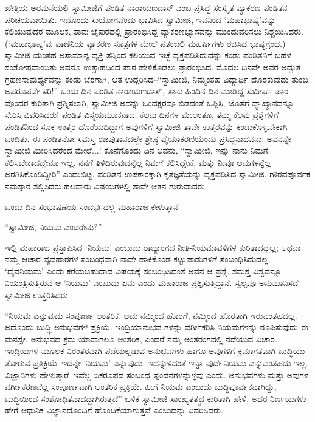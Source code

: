 ಖೇತ್ರಿಯ ಅರಮನೆಯಲ್ಲಿ ಸ್ವಾಮೀಜಿಗೆ ಪಂಡಿತ ನಾರಾಯಣದಾಸ್ ಎಂಬ ಪ್ರಸಿದ್ಧ ಸಂಸ್ಕೃತ ವ್ಯಾಕರಣ ಪಂಡಿತನ ಪರಿಚಯವಾಯಿತು. ಇದೊಂದು ಸುಯೋಗವೆಂದು ಭಾವಿಸಿದ ಸ್ವಾಮೀಜಿ, ಇವನಿಂದ ‘ಮಹಾಭಾಷ್ಯ’ವನ್ನು ಕಲಿಯುವುದರ ಮೂಲಕ, ತಾವು ಜೈಪುರದಲ್ಲಿ ಪ್ರಾರಂಭಿಸಿದ್ದ ವ್ಯಾಕರಣಭ್ಯಾಸವನ್ನು ಮುಂದುವರಿಸಲು ನಿಶ್ಚಯಿಸಿದರು. (‘ಮಹಾಭಾಷ್ಯ’ವು ಪಾಣಿನಿಯ ವ್ಯಾಕರಣ ಸೂತ್ರಗಳ ಮೇಲೆ ಪತಂಜಲಿ ಮಹರ್ಷಿಗಳು ರಚಿಸಿದ ಭಾಷ್ಯಗ್ರಂಥ.) ಸ್ವಾಮೀಜಿ ಯಂತಹ ಅಸಾಮಾನ್ಯ ವ್ಯಕ್ತಿ ತನ್ನಿಂದ ಕಲಿಯುವ ಇಚ್ಛೆ ವ್ಯಕ್ತಪಡಿಸಿದುದನ್ನು ಕಂಡು ಪಂಡಿತನಿಗೆ ಬಹಳ ಸಂತೋಷವಾಯಿತು ಅವನೂ ಉತ್ಸಾಹದಿಂದ ಪಾಠ ಹೇಳಿಕೊಡಲು ಪ್ರಾರಂಭಿಸಿದ. ಮೊದಲ ದಿನವೇ ಅವರ ಅದ್ಭುತ ಗ್ರಹಣಸಾಮರ್ಥ್ಯವನ್ನು ಕಂಡು ಬೆರಗಾಗಿ, ಆತ ಉದ್ಗರಿಸಿದ–“ಸ್ವಾಮೀಜಿ, ನಿಮ್ಮಂತಹ ವಿದ್ಯಾರ್ಥಿ ದೊರಕುವುದು ತುಂಬ ಅಪರೂಪವೇ ಸರಿ!” ಒಂದು ದಿನ ಪಂಡಿತ ನಾರಾಯಣದಾಸ್, ತಾನು ಹಿಂದಿನ ದಿನ ಮಾಡಿದ್ದ ಸುದೀರ್ಘ ಪಾಠ ವೊಂದರ ಕುರಿತಾಗಿ ಪ್ರಶ್ನಿಸಲಾಗಿ, ಸ್ವಾಮೀಜಿ ಅದನ್ನು ಒಂದಕ್ಷರವೂ ಬಿಡದಂತೆ ಒಪ್ಪಿಸಿ, ಜೊತೆಗೆ ವ್ಯಾಖ್ಯಾನವನ್ನೂ ಸೇರಿಸಿ ವಿವರಿಸಿದರು! ಪಂಡಿತ ವಿಸ್ಮಯಮೂಕನಾದ. ಕೆಲವು ದಿನಗಳ ಮೇಲಂತೂ, ತಮ್ಮ ಕೆಲವು ಪ್ರಶ್ನೆಗಳಿಗೆ ಪಂಡಿತನಿಂದ ಸೂಕ್ತ ಉತ್ತರ ದೊರೆಯದಿದ್ದಾಗ ಅವುಗಳಿಗೆ ಸ್ವಾಮೀಜಿ ತಾವೇ ಉತ್ತರವನ್ನು ಕಂಡುಕೊಳ್ಳಬೇಕಾಗಿ ಬಂದಿತು. ಈ ಪಂಡಿತನೋ ಸಮಸ್ತ ರಜಪುತಾನದಲ್ಲೇ ಶ್ರೇಷ್ಠ ವೈಯಾಕರಣಿಯೆಂದು ಪ್ರಸಿದ್ಧನಾದವನು. ಅವನನ್ನೇ ಸ್ವಾಮೀಜಿ ಮೀರಿಸಿದರೆಂದ ಮೇಲೆ...! ಕೊನೆಗೊಂದು ದಿನ ಅವನು, “ಸ್ವಾಮೀಜಿ, ಇನ್ನು ನಾನು ನಿಮಗೆ ಕಲಿಸಬೇಕಾದದ್ದೇನೂ ಇಲ್ಲ. ನನಗೆ ತಿಳಿದಿರುವುದನ್ನೆಲ್ಲ ನಿಮಗೆ ಕಲಿಸಿದ್ದೇನೆ, ಮತ್ತು ನೀವೂ ಅವುಗಳನ್ನೆಲ್ಲ ಅರಗಿಸಿಕೊಂಡಿದ್ದೀರಿ” ಎಂದುಬಿಟ್ಟ. ಪಂಡಿತನ ಉಪಕಾರಕ್ಕಾಗಿ ಕೃತಜ್ಞತೆಯನ್ನು ವ್ಯಕ್ತಪಡಿಸಿದ ಸ್ವಾಮೀಜಿ, ಗೌರವಪೂರ್ವಕ ನಮಸ್ಕಾರ ಸಲ್ಲಿಸಿದರು;ಹಲವಾರು ವಿಷಯಗಳಲ್ಲಿ ತಾವೇ ಆತನ ಗುರುವಾದರು.

ಒಂದು ದಿನ ಸಂಭಾಷಣೆಯ ಸಂದರ್ಭದಲ್ಲಿ ಮಹಾರಾಜ ಕೇಳುತ್ತಾನೆ–

“ಸ್ವಾಮೀಜಿ, ನಿಯಮ  ಎಂದರೇನು?”

ಇಲ್ಲಿ ಮಹಾರಾಜ ಪ್ರಸ್ತಾಪಿಸಿದ ‘ನಿಯಮ’ ಎಂಬುದು ರಾಜ್ಯಾಂಗದ ನೀತಿ-ನಿಯಮಾವಳಿಗಳ ಕುರಿತಾದದ್ದಲ್ಲ; ಅಥವಾ ನಮ್ಮ ಆಚಾರ-ವ್ಯವಹಾರಗಳ ಸಂಬಂಧವಾಗಿ ನಾವೇ ಹಾಕಿಕೊಂಡ ಕಟ್ಟುಪಾಡುಗಳಿಗೆ ಸಂಬಂಧಿಸಿದುದಲ್ಲ. ‘ದೈವನಿಯಮ’ ಎಂದು ಕರೆಯಬಹುದಾದ ವಿಷಯಕ್ಕೆ ಸಂಬಂಧಿಸಿದಂತೆ ಅವನ ಆ ಪ್ರಶ್ನೆ. ಸಮಸ್ತ ವಿಶ್ವವನ್ನೂ ನಿಯಂತ್ರಿಸುತ್ತಿರುವ ಆ ‘ನಿಯಮ’ ಎಂಬುದು ಏನು ಎಂದು ಮಹಾರಾಜ ಪ್ರಶ್ನಿಸುತ್ತಿದ್ದಾನೆ. ಸ್ವಲ್ಪವೂ ಅನುಮಾನಿಸದೆ ಸ್ವಾಮೀಜಿ ಉತ್ತರಿಸಿದರು–

“ನಿಯಮ ಎನ್ನುವುದು ಸಂಪೂರ್ಣ ಆಂತರಿಕ. ಅದು ನಮ್ಮಿಂದ ಹೊರಗೆ, ನಮ್ಮಿಂದ ಹೊರತಾಗಿ ಇರುವಂತಹದಲ್ಲ. ಅದೊಂದು ಬುದ್ಧಿ-ಅನುಭವಗಳ ಪ್ರಕ್ರಿಯೆ. ಇಂದ್ರಿಯಾನುಭವ ಗಳನ್ನು ವರ್ಗೀಕರಿಸಿ ನಿಯಮಗಳನ್ನು ರೂಪಿಸುವುದು ಈ ಮನಸ್ಸೇ. ಅನುಭವದ ಕ್ರಮ ಯಾವಾಗಲೂ ಆಂತರಿಕ, ಎಂದರೆ ನಮ್ಮ ಅಂತರಂಗದಲ್ಲಿ ನಡೆಯುವ ವಿಚಾರ. ಇಂದ್ರಿಯಗಳ ಮೂಲಕ ನಿರಂತರವಾಗಿ ಪಡೆಯಲ್ಪಡುವ ಅನುಭವಗಳು ಹಾಗೂ ಅವುಗಳಿಗೆ ಕ್ರಮಾಗತವಾಗಿ ಬುದ್ಧಿಯು ತೋರುವ ಪ್ರತಿಕ್ರಿಯೆ–ಇದನ್ನೇ ‘ನಿಯಮ’ ಎನ್ನುವುದು. ಇದನ್ನುಳಿದಂತೆ ಇನ್ನಾ ವುದೇ ನಿಯಮ ಎನ್ನುವಂತಹದು ಇಲ್ಲ. ವಿಜ್ಞಾನಿಗಳು ಹೇಳುತ್ತಾರೆ–ಇವೆಲ್ಲ ಏಕರೂಪದ ಸಂಬಂಧ–ಸ್ಪಂದನಗಳನ್ನುಳ್ಳವು ಎಂದು. ಅನುಭವಗಳು ಮತ್ತು ಅವುಗಳ ವರ್ಗೀಕರಣವೆಲ್ಲ ಸಂಪೂರ್ಣವಾಗಿ ಆಂತರಿಕ ಪ್ರಕ್ರಿಯೆ. ಹೀಗೆ ನಿಯಮ ಎಂಬುದು ಬುದ್ಧಿಪೂರ್ವಕವಾಗಿದ್ದು, ಬುದ್ಧಿಯಿಂದ ಸಂಶೋಧಿತವಾದದ್ದಾಗಿರುತ್ತದೆ” ಬಳಿಕ ಸ್ವಾಮೀಜಿ ಸಾಂಖ್ಯತತ್ತ್ವದ ಕುರಿತಾಗಿ ಹೇಳಿ, ಅದರ ನಿರ್ಣಯಗಳು ಹೇಗೆ ಆಧುನಿಕ ವಿಜ್ಞಾನದೊಂದಿಗೆ ಹೊಂದಿಕೆಯಾಗುತ್ತವೆ ಎಂಬುದನ್ನು ವಿವರಿಸಿದರು.

